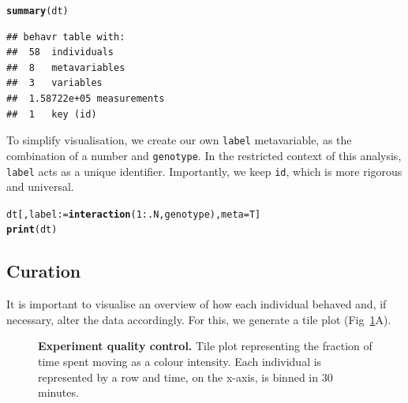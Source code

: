 \documentclass[10pt,letterpaper]{article}\usepackage[]{graphicx}\usepackage[]{color}
\makeatletter
\newcommand{\hlnum}[1]{\textcolor[rgb]{0.686,0.059,0.569}{#1}}%
\newcommand{\hlopt}[1]{\textcolor[rgb]{0,0,0}{#1}}%
\newcommand{\hlstd}[1]{\textcolor[rgb]{0.345,0.345,0.345}{#1}}%
\newcommand{\hlkwb}[1]{\textcolor[rgb]{0.69,0.353,0.396}{#1}}%
\newcommand{\hlkwc}[1]{\textcolor[rgb]{0.333,0.667,0.333}{#1}}%
\newcommand{\hlkwd}[1]{\textcolor[rgb]{0.737,0.353,0.396}{\textbf{#1}}}%
\newenvironment{kframe}{%
 \def\at@end@of@kframe{}%
 \ifinner\ifhmode%
  \def\at@end@of@kframe{\end{minipage}}%
  \begin{minipage}{\columnwidth}%
 \fi\fi%
 \def\FrameCommand##1{\hskip\@totalleftmargin \hskip-\fboxsep
 \colorbox{shadecolor}{##1}\hskip-\fboxsep
     \hskip-\linewidth \hskip-\@totalleftmargin \hskip\columnwidth}%
 \MakeFramed {\advance\hsize-\width
   \@totalleftmargin\z@ \linewidth\hsize
   \@setminipage}}%
 {\par\unskip\endMakeFramed%
 \at@end@of@kframe}
\newenvironment{knitrout}{}{} %
\makeatother
\begin{document}
\begin{knitrout}
\color{fgcolor}\begin{kframe}
\begin{alltt}
\hlkwd{summary}\hlstd{(dt)}
\end{alltt}
\begin{verbatim}
## behavr table with:
##  58	individuals
##  8	metavariables
##  3	variables
##  1.58722e+05	measurements
##  1	key (id)
\end{verbatim}
\end{kframe}
\end{knitrout}

To simplify visualisation, we create our own \texttt{label} metavariable, as the combination of a number and \texttt{genotype}.
In the restricted context of this analysis, \texttt{label} acts as a unique identifier.
Importantly, we keep \texttt{id}, which is more rigorous and universal.



\begin{knitrout}
\color{fgcolor}\begin{kframe}
\begin{alltt}
\hlstd{dt[, label} \hlkwb{:=} \hlkwd{interaction}\hlstd{(}\hlnum{1}\hlopt{:}\hlstd{.N, genotype),} \hlkwc{meta}\hlstd{=T]}
\hlkwd{print}\hlstd{(dt)}
\end{alltt}
\end{kframe}
\end{knitrout}


\subsection*{Curation}
It is important to visualise an overview of how each individual behaved and, if necessary, alter the data accordingly. For this, we generate a tile plot (Fig~\ref{fig:fig-3}A).

\begin{figure}[!h]
	\caption{{\bf Experiment quality control.}
			Tile plot representing the fraction of time spent moving as a colour intensity.
			Each individual is represented by a row and time, on the x-axis, is binned in 30 minutes.}
	\label{fig:fig-3}
\end{figure}
\end{document}
